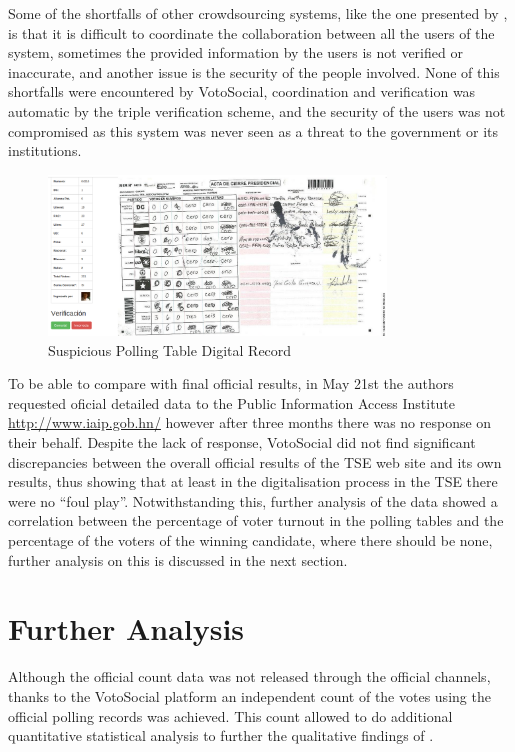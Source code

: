 \documentclass[letterpaper,10pt]{article}
\begin{document}
Some of the shortfalls of other crowdsourcing systems, like the one presented by \cite{gao2011}, is that it is difficult to coordinate the collaboration between all the users of the system, sometimes the provided information by the users is not verified or inaccurate, and another issue is the security of the people involved. None of this shortfalls were encountered by VotoSocial, coordination and verification was automatic by the triple verification scheme, and the security of the users was not compromised as this system was never seen as a threat to the government or its institutions.

\begin{figure}[h!]
    \centering
    \includegraphics[width=0.8\textwidth]{images/vs-valid-strange}
    \caption{Suspicious Polling Table Digital Record}
    \label{fig:strange}
\end{figure}

To be able to compare with final official results, in May 21st the authors requested oficial detailed data to the Public Information Access Institute \url{http://www.iaip.gob.hn/} however after three months there was no response on their behalf. Despite the lack of response, VotoSocial did not find significant discrepancies between the overall official results of the TSE web site and its own results, thus showing that at least in the digitalisation process in the TSE there were no ``foul play''. Notwithstanding this, further analysis of the data showed a correlation between the percentage of voter turnout in the polling tables and the percentage of the voters of the winning candidate, where there should be none, further analysis on this is discussed in the next section.




\section{Further Analysis}

Although the official count data was not released through the official channels, thanks to the VotoSocial platform an independent count of the votes using the official polling records was achieved. This count allowed to do additional quantitative statistical analysis to further the qualitative findings of \cite{gonza2014}.
\end{document}
